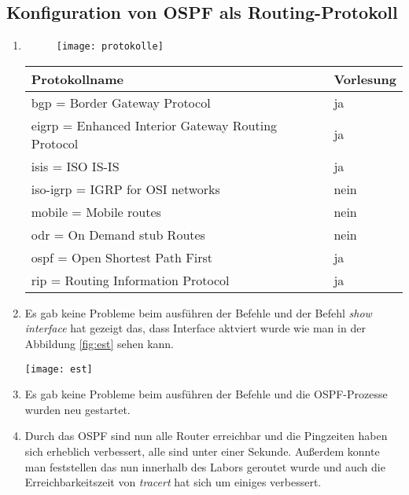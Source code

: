\documentclass{scrartcl}
\begin{document}
   \subsection[Augabe 6 Konfiguration von OSPF als Routing-Protokoll]{Konfiguration von OSPF als Routing-Protokoll}
   
    \renewcommand{\labelenumi}{\alph{enumi})}
    \begin{enumerate}
    \item
    \begin{figure}[htbp]
    \centering
    \texttt{[image: protokolle]}
    \label{fig:protokolle}
    \end{figure}
    
   \begin{table}[htbp]
  \begin{tabular}{|l|l}
      \textbf{Protokollname} & \textbf{Vorlesung} \\ \hline
		 bgp = Border Gateway Protocol  & ja \\
		 eigrp = Enhanced Interior Gateway Routing Protocol  & ja \\
		 isis = ISO IS-IS & ja\\
		 iso-igrp = IGRP for OSI networks & nein \\
		 mobile = Mobile routes & nein\\
		 odr = On Demand stub Routes & nein \\
		 ospf = Open Shortest Path First & ja\\
		 rip = Routing Information Protocol & ja
    \end{tabular}
   \end{table}
    
    \item
    Es gab keine Probleme beim ausführen der Befehle und der Befehl \textit{show interface} hat gezeigt das, dass Interface aktviert wurde wie man in der Abbildung \ref{fig:est} sehen kann.
    
   \texttt{[image: est]}
   \label{fig:est}

    
    \item
    Es gab keine Probleme beim ausführen der Befehle und die OSPF-Prozesse wurden neu gestartet.
    
    \item
    Durch das OSPF sind nun alle Router erreichbar und die Pingzeiten haben sich erheblich verbessert, alle sind unter einer Sekunde. Außerdem konnte man feststellen das nun innerhalb des Labors geroutet wurde und auch die Erreichbarkeitszeit von \textit{tracert} hat sich um einiges verbessert.
    

\end{enumerate}
\end{document}
